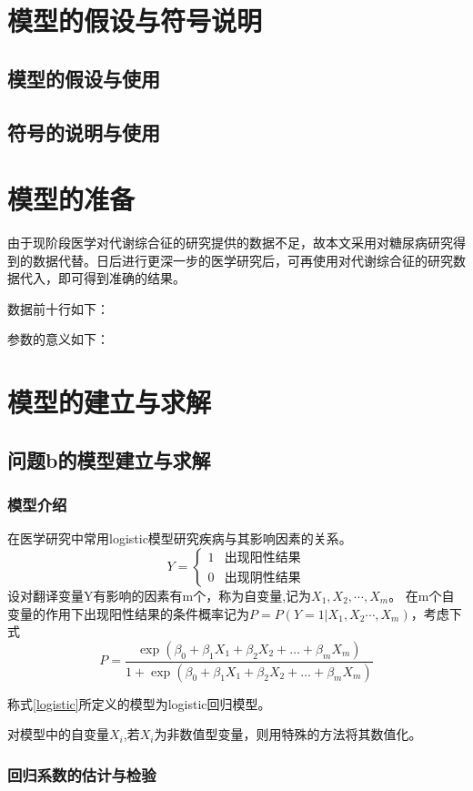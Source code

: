 \documentclass[bwprint]{cumcmthesis}
\begin{document}
\section{模型的假设与符号说明}
\subsection{模型的假设与使用}
\subsection{符号的说明与使用}
\section{模型的准备}
由于现阶段医学对代谢综合征的研究提供的数据不足，故本文采用对糖尿病研究得到的数据代替。日后进行更深一步的医学研究后，可再使用对代谢综合征的研究数据代入，即可得到准确的结果。

数据前十行如下：

参数的意义如下：

\section{模型的建立与求解}
\subsection{问题b的模型建立与求解}
\subsubsection{模型介绍}
在医学研究中常用logistic模型研究疾病与其影响因素的关系。
\[ Y=\begin{cases}
1 &\text{出现阳性结果}\\
0 &\text{出现阴性结果}
\end{cases} \]
设对翻译变量Y有影响的因素有m个，称为自变量,记为$ X_{1},X_{2},\cdots,X_{m} $。
在m个自变量的作用下出现阳性结果的条件概率记为$ P=P(Y=1|X_{1},X_{2}\cdots,X_{m}) $，考虑下式
\begin{equation}
\label{logistic}
P=\dfrac{\exp(\beta_{0}+\beta_{1}X_{1}+\beta_{2}X_{2}+\ldots+\beta_{m}X_{m})}{1+\exp(\beta_{0}+\beta_{1}X_{1}+\beta_{2}X_{2}+\ldots+\beta_{m}X_{m})}
\end{equation}

称式\eqref{logistic}所定义的模型为logistic回归模型。

对模型中的自变量$ X_{i} $,若$ X_{i} $为非数值型变量，则用特殊的方法将其数值化。
\subsubsection{回归系数的估计与检验}
\end{document}
